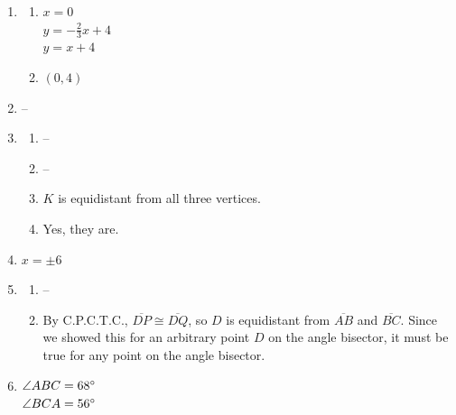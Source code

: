 \documentclass{article}
\begin{document}
\begin{enumerate}
\begin{enumerate}
	\item $w = 108 \degree$
	
	\item $u = 26 \degree$
	
	\end{enumerate}
	
\item

	\begin{enumerate}
	
	\item $x = 0$ \\
		$y = -\frac{2}{3}x + 4$ \\
		$y = x + 4$
		
	\item $(0, 4)$
	
	\end{enumerate}
	
\item --

\item

	\begin{enumerate}
	
	\item --
	
	\item --
	
	\item $K$ is equidistant from all three vertices.
	
	\item Yes, they are.
	
	\end{enumerate}
	
\item $x = \pm 6$

\item

	\begin{enumerate}
	
	\item --
	
	\item By C.P.C.T.C., $\overline{DP} \cong \overline{DQ}$, so $D$ is equidistant from $\overline{AB}$ and $\overline{BC}$. Since we showed this for an arbitrary point $D$ on the angle bisector, it must be true for any point on the angle bisector.
	
	\end{enumerate}
	
\item $\angle ABC = 68 \degree$ \\
	$\angle BCA = 56 \degree$
	

\end{enumerate}
\end{document}
